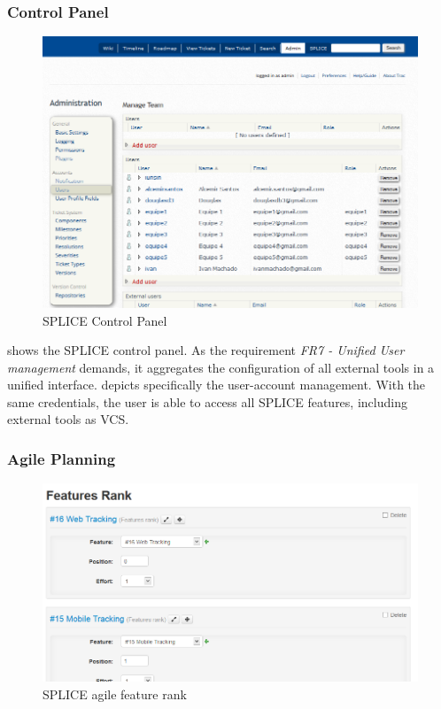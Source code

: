 \subsubsection{Control Panel}
\begin{figure}[htp]
\begin{center}
  \includegraphics[width=16cm]{chapters/proposed_solution/img/captures/config.PNG}
  \caption[SPLICE Control Panel]{SPLICE Control Panel }
  \label{fg:splice-controlpanel}
\end{center}
\end{figure}

 shows the \ac{SPLICE} control panel. As the requirement \textit{FR7 - Unified User management} demands, it aggregates the configuration of all external tools in a unified interface.  depicts specifically the user-account management. With the same credentials, the user is able to access all \ac{SPLICE} features, including external tools as \acf{VCS}. 

\subsubsection{Agile Planning}
\begin{figure}[htp]
\begin{center}
  \includegraphics[width=16cm]{chapters/proposed_solution/img/captures/Feature_rank.PNG}
  \caption[SPLICE agile feature rank]{SPLICE agile feature rank }
  \label{fg:splice-feature-rank}
\end{center}
\end{figure}

